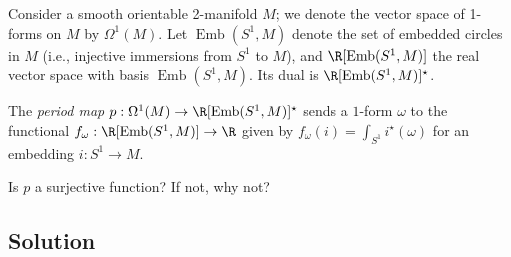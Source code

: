 \documentclass[12pt]{quiz}
\DeclareMathOperator{\Emb}{Emb}
\begin{document}
\maketitle

\noindent
Consider a smooth orientable 2-manifold $M$; we denote the vector
space of 1-forms on $M$ by $\Omega^1(M)$.  Let $\Emb(S^1,M)$ denote
the set of embedded circles in $M$ (i.e., injective immersions from
$S^1$ to $M$), and $\R[\Emb(S^1,M)]$ the real vector space with basis
$\Emb(S^1,M)$.  Its dual is $\R[\Emb(S^1,M)]^\star$.

\vspace{2ex}\noindent%
The \textit{period map} $p : \Omega^1(M) \to \R[\Emb(S^1,M)]^\star$
sends a $1$-form $\omega$ to the functional $f_\omega :
\R[\Emb(S^1,M)] \to \R$ given by $f_\omega(i) = \int_{S^1}
i^\star(\omega)$ for an embedding $i :S^1 \to M$.

\vspace{2ex}\noindent%
Is $p$ a surjective function?  If not, why not?

\subsection*{Solution}

\pagebreak
\null

\end{document}

